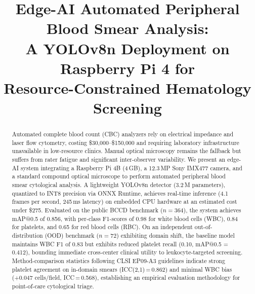 \documentclass[10pt,conference]{IEEEtran}
\begin{document}
\title{%
  Edge-AI Automated Peripheral Blood Smear Analysis:\\
  A YOLOv8n Deployment on Raspberry Pi 4 for\\
  Resource-Constrained Hematology Screening%
}

\author{%
}

\maketitle
\IEEEpeerreviewmaketitle

\begin{abstract}
Automated complete blood count (CBC) analyzers rely on electrical impedance and laser flow cytometry, costing \$30,000–\$150,000 and requiring laboratory infrastructure unavailable in low-resource clinics. Manual optical microscopy remains the fallback but suffers from rater fatigue and significant inter-observer variability. We present an edge-AI system integrating a Raspberry Pi 4B (4\,GB), a 12.3\,MP Sony IMX477 camera, and a standard compound optical microscope to perform automated peripheral blood smear cytological analysis. A lightweight YOLOv8n detector (3.2\,M parameters), quantized to INT8 precision via ONNX Runtime, achieves real-time inference (4.1 frames per second, 245\,ms latency) on embedded CPU hardware at an estimated cost under \$275. Evaluated on the public BCCD benchmark ($n=364$), the system achieves mAP@0.5 of 0.856, with per-class F1-scores of 0.98 for white blood cells (WBC), 0.84 for platelets, and 0.65 for red blood cells (RBC). On an independent out-of-distribution (OOD) benchmark ($n=72$) exhibiting domain shift, the baseline model maintains WBC F1 of 0.83 but exhibits reduced platelet recall (0.10, mAP@0.5 = 0.412), bounding immediate cross-center clinical utility to leukocyte-targeted screening. Method-comparison statistics following CLSI EP09-A3 guidelines indicate strong platelet agreement on in-domain smears (ICC(2,1)\,=\,0.862) and minimal WBC bias (+0.047 cells/field, ICC\,=\,0.568), establishing an empirical evaluation methodology for point-of-care cytological triage.
\end{abstract}
\end{document}
